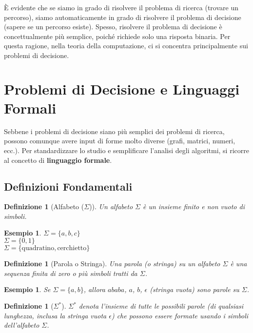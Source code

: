 \documentclass[a4paper, 11pt]{book} %
\newtheorem{definition}[theorem]{Definizione}
\newtheorem{example}[theorem]{Esempio}
\theoremstyle{definition}
\begin{document}
È evidente che se siamo in grado di risolvere il problema di ricerca (trovare un percorso), siamo automaticamente in grado di risolvere il problema di decisione (sapere se un percorso esiste). Spesso, risolvere il problema di decisione è concettualmente più semplice, poiché richiede solo una risposta binaria. Per questa ragione, nella teoria della computazione, ci si concentra principalmente sui problemi di decisione.

\section{Problemi di Decisione e Linguaggi Formali}

Sebbene i problemi di decisione siano più semplici dei problemi di ricerca, possono comunque avere input di forme molto diverse (grafi, matrici, numeri, ecc.). Per standardizzare lo studio e semplificare l'analisi degli algoritmi, si ricorre al concetto di \textbf{linguaggio formale}.

\subsection{Definizioni Fondamentali}

\begin{definition}[Alfabeto ($\Sigma$)]
Un alfabeto $\Sigma$ è un insieme finito e non vuoto di simboli.
\end{definition}
\begin{example}
$\Sigma = \{a, b, c\}$ \\
$\Sigma = \{0, 1\}$ \\
$\Sigma = \{\text{quadratino}, \text{cerchietto}\}$
\end{example}

\begin{definition}[Parola o Stringa]
Una parola (o stringa) su un alfabeto $\Sigma$ è una sequenza finita di zero o più simboli tratti da $\Sigma$.
\end{definition}
\begin{example}
Se $\Sigma = \{a, b\}$, allora $ababa$, $a$, $b$, $\epsilon$ (stringa vuota) sono parole su $\Sigma$.
\end{example}

\begin{definition}[$\Sigma^*$]
$\Sigma^*$ denota l'insieme di tutte le possibili parole (di qualsiasi lunghezza, inclusa la stringa vuota $\epsilon$) che possono essere formate usando i simboli dell'alfabeto $\Sigma$.
\end{definition}
\end{document}
